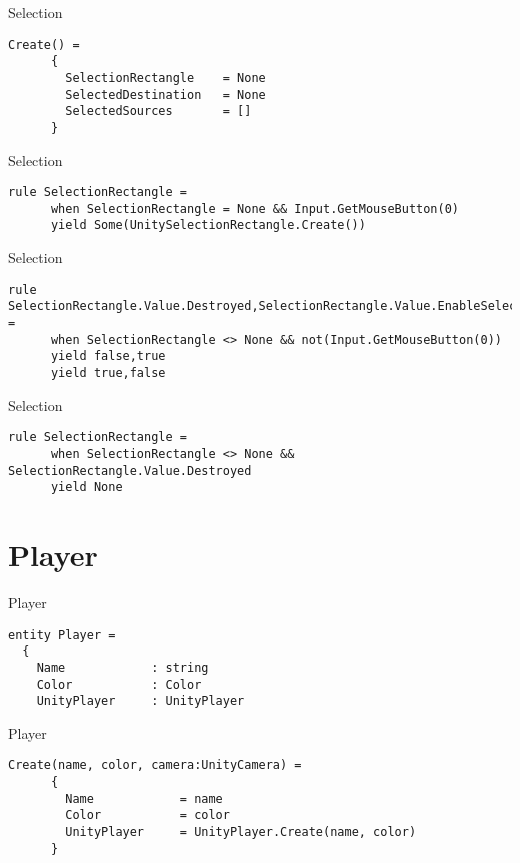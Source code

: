 \documentclass{beamer}
\begin{document}
\begin{frame}[fragile]{Selection}
\begin{lstlisting}[frame=shadowbox]
    Create() =
      {
        SelectionRectangle    = None
        SelectedDestination   = None
        SelectedSources       = []
      }
\end{lstlisting}
\end{frame}


\begin{frame}[fragile]{Selection}
\begin{lstlisting}[frame=shadowbox]
    rule SelectionRectangle = 
      when SelectionRectangle = None && Input.GetMouseButton(0)
      yield Some(UnitySelectionRectangle.Create())
\end{lstlisting}
\end{frame}

\begin{frame}[fragile]{Selection}
\begin{lstlisting}[frame=shadowbox]
    rule SelectionRectangle.Value.Destroyed,SelectionRectangle.Value.EnableSelection = 
      when SelectionRectangle <> None && not(Input.GetMouseButton(0))
      yield false,true
      yield true,false
\end{lstlisting}
\end{frame}

\begin{frame}[fragile]{Selection}
\begin{lstlisting}[frame=shadowbox]
    rule SelectionRectangle = 
      when SelectionRectangle <> None && SelectionRectangle.Value.Destroyed
      yield None
\end{lstlisting}
\end{frame}


\section{Player}
\begin{frame}[fragile]{Player}
\begin{lstlisting}[frame=shadowbox]
entity Player = 
  {
    Name            : string
    Color           : Color
    UnityPlayer     : UnityPlayer
\end{lstlisting}
\end{frame}

\begin{frame}[fragile]{Player}
\begin{lstlisting}[frame=shadowbox]
    Create(name, color, camera:UnityCamera) =
      {
        Name            = name
        Color           = color
        UnityPlayer     = UnityPlayer.Create(name, color)
      }
\end{lstlisting}
\end{frame}
\end{document}
